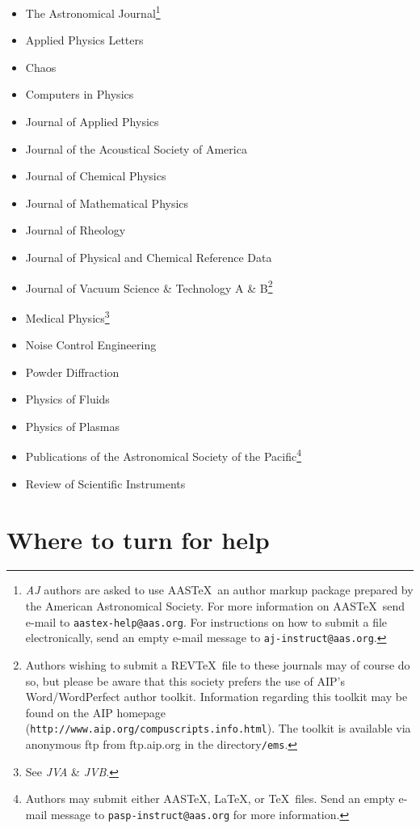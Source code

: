 \begin{itemize}

\item The Astronomical Journal\footnote{{\it AJ} authors are
asked to use AAS\TeX\, an author markup package prepared by the
American Astronomical Society. For more information on AAS\TeX\,
send e-mail to {\tt aastex-help@aas.org}. For instructions on how
to submit a file electronically, send an empty e-mail message to
{\tt aj-instruct@aas.org}.}
\item Applied Physics Letters
\item Chaos
\item Computers in Physics
\item Journal of Applied Physics
\item Journal of the Acoustical Society of America
\item Journal of Chemical Physics
\item Journal of Mathematical Physics
\item Journal of Rheology
\item Journal of Physical and Chemical Reference Data
\item Journal of Vacuum Science \& Technology A \& B\footnote{Authors
wishing to submit a REV\TeX\ file to these journals may of course
do so, but please be aware that this society prefers the use of AIP's
Word/WordPerfect author toolkit. Information regarding this toolkit
may be found on the AIP homepage
 \protect({\tt http://www.aip.org/compuscripts.info.html}).
 The toolkit is available via anonymous ftp from ftp.aip.org in
 the directory{\tt /ems}.}
 \item Medical Physics\footnote{See {\it JVA} \& {\it JVB}.}
 \item Noise Control Engineering
 \item Powder Diffraction
 \item Physics of Fluids
 \item Physics of Plasmas
 \item Publications of the Astronomical Society of the Pacific\footnote{%
 Authors may submit either AAS\TeX\/, \LaTeX\/, or \TeX\ files. Send an
 empty e-mail message to {\tt pasp-instruct@aas.org} for more information.}
 \item Review of Scientific Instruments

 \end{itemize}

\section{Where to turn for help}

